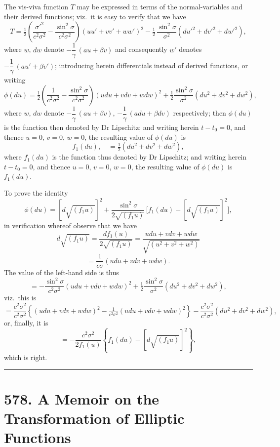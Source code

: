 \documentclass[11pt]{article}
\begin{document}
The vis-viva function $T$ may be expressed in terms of the normal-variables and their derived functions; viz.\ it is easy to verify that we have
\[
T = \tfrac{1}{2}\!\left(\frac{\sigma'^{2}}{c^{2}\sigma^{2}} - \frac{\sin^{2}\sigma}{c^{2}\sigma^{2}}\right)(uu' + vv' + ww')^{2}
- \tfrac{1}{2}\,\frac{\sin^{2}\sigma}{\sigma^{2}}(du'^{2} + dv'^{2} + dw'^{2}),
\]
where $w$, $dw$ denote $-\dfrac{1}{\gamma}\,(a u + \beta v)$ and consequently $w'$ denotes $-\dfrac{1}{\gamma}\,(a u' + \beta v')$; introducing herein differentials instead of derived functions, or writing
\[
\phi(du) = \tfrac{1}{2}\!\left(\frac{1}{c^{2}\sigma^{2}} - \frac{\sin^{2}\sigma}{c^{2}\sigma^{2}}\right)(udu + vdv + wdw)^{2}
+ \tfrac{1}{2}\frac{\sin^{2}\sigma}{\sigma^{2}}(du^{2} + dv^{2} + dw^{2}),
\]
where $w$, $dw$ denote $-\dfrac{1}{\gamma}\,(a u + \beta v)$, $-\dfrac{1}{\gamma}\,(a du + \beta dv)$ respectively; then $\phi(du)$ is the function then denoted by Dr Lipschitz; and writing herein $t - t_{0} = 0$, and thence $u = 0$, $v = 0$, $w = 0$, the resulting value of $\phi(du)$ is
\[
f_{1}(du),\quad = \tfrac{1}{2}(du^{2} + dv^{2} + dw^{2}),
\]
where $f_{1}(du)$ is the function thus denoted by Dr Lipschitz; and writing herein $t - t_{0} = 0$, and thence $u = 0$, $v = 0$, $w = 0$, the resulting value of $\phi(du)$ is $f_{1}(du)$.

To prove the identity
\[
\phi(du) = [d\sqrt{(f_{1}u)}]^{2} + \frac{\sin^{2}\sigma}{2\sqrt{(f_{1}u)}}\,\bigl[f_{1}(du) - [d\sqrt{(f_{1}u)}]^{2}\bigr],
\]
in verification whereof observe that we have
\[
d\sqrt{(f_{1}u)} = \frac{df_{1}(u)}{2\sqrt{(f_{1}u)}} = \frac{udu + vdv + wdw}{\sqrt{(u^{2} + v^{2} + w^{2})}}
\]
\[
= \frac{1}{c\sigma}(udu + vdv + wdw).
\]
The value of the left-hand side is thus
\[
= -\frac{\sin^{2}\sigma}{c^{2}\sigma^{2}}(udu + vdv + wdw)^{2} + \tfrac{1}{2}\frac{\sin^{2}\sigma}{\sigma^{2}}(du^{2} + dv^{2} + dw^{2}),
\]
viz.\ this is
\[
= \frac{c^{2}\sigma^{2}}{c^{2}\sigma^{2}}\!\left\{(udu + vdv + wdw)^{2} - \tfrac{1}{c^{2}\sigma^{2}}(udu + vdv + wdw)^{2}\right\}
- \frac{c^{2}\sigma^{2}}{c^{2}\sigma^{2}}(du^{2} + dv^{2} + dw^{2}),
\]
or, finally, it is
\[
= -\frac{c^{2}\sigma^{2}}{2f_{1}(u)}\!\left\{f_{1}(du) - [d\sqrt{(f_{1}u)}]^{2}\right\},
\]
which is right.

\bigskip
\hrule
\bigskip

\section*{578. A Memoir on the Transformation of Elliptic Functions}
\end{document}

